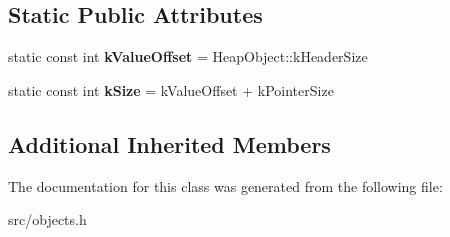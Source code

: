 \subsection*{Static Public Attributes}
\begin{DoxyCompactItemize}
\item 
\hypertarget{classv8_1_1internal_1_1_cell_acfd85eb2807c5733f141824831db579a}{}static const int {\bfseries k\+Value\+Offset} = Heap\+Object\+::k\+Header\+Size\label{classv8_1_1internal_1_1_cell_acfd85eb2807c5733f141824831db579a}

\item 
\hypertarget{classv8_1_1internal_1_1_cell_a89511edf4b516f88407a31344483d897}{}static const int {\bfseries k\+Size} = k\+Value\+Offset + k\+Pointer\+Size\label{classv8_1_1internal_1_1_cell_a89511edf4b516f88407a31344483d897}

\end{DoxyCompactItemize}
\subsection*{Additional Inherited Members}


The documentation for this class was generated from the following file\+:\begin{DoxyCompactItemize}
\item 
src/objects.\+h\end{DoxyCompactItemize}
